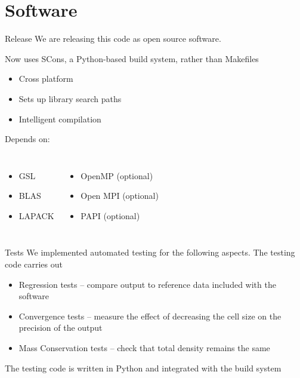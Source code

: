 \documentclass{beamer}
\begin{document}
\section{Software}
    \begin{frame}{Release}
        We are releasing this code as open source software.

        \vfill

        Now uses SCons, a Python-based build system, rather than Makefiles
        \begin{itemize}
            \item Cross platform
            \item Sets up library search paths
            \item Intelligent compilation
        \end{itemize}

        \vfill

        Depends on:
        \begin{columns}
            \begin{itemize}
                \item GSL
                \item BLAS
                \item LAPACK
            \end{itemize}
            \begin{itemize}
                \item OpenMP (optional)
                \item Open MPI (optional)
                \item PAPI (optional)
            \end{itemize}
        \end{columns}
    \end{frame}

    \begin{frame}{Tests}
        We implemented automated testing for the following aspects. The testing code carries out
        \begin{itemize}
            \item Regression tests -- compare output to reference data included with the software
            \item Convergence tests -- measure the effect of decreasing the cell size on the precision of the output
            \item Mass Conservation tests -- check that total density remains the same
        \end{itemize}

        \vfill

        The testing code is written in Python and integrated with the build system
    \end{frame}
\end{document}
